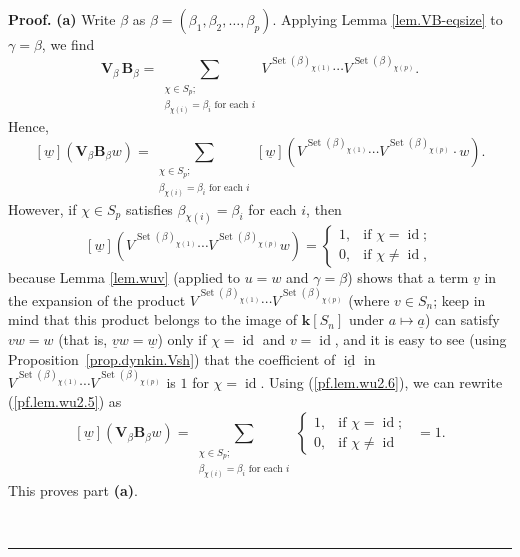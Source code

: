 \documentclass[submission]{FPSAC2026}
\newcommand{\id}{\operatorname{id}} %
\newcommand{\kk}{\mathbf{k}} %
\newcommand{\Set}{\operatorname{Set}}
\newenvironment{proof}[1][Proof]{\noindent\textbf{#1.} }{\ \rule{0.5em}{0.5em}}
\begin{document}
\begin{proof}
\textbf{(a)} Write $\beta$ as $\beta=\left(  \beta_{1},\beta_{2},\ldots
,\beta_{p}\right)  $.
Applying Lemma \ref{lem.VB-eqsize} to $\gamma=\beta$, we
find%
\[
\mathbf{V}_{\beta}\,\mathbf{B}_{\beta}=\sum_{\substack{\chi\in S_{p}%
;\\\beta_{\chi\left(  i\right)  }=\beta_{i}\text{ for each }i}}
V^{\operatorname{Set}(\beta)_{\chi(1)}}\cdots
V^{\operatorname{Set}(\beta)_{\chi(p)}}.
\]
Hence,%
\begin{equation}
\left[  \underline w \right]  \left(  \mathbf{V}_{\beta}\mathbf{B}_{\beta}w\right)
=\sum_{\substack{\chi\in S_{p};\\\beta_{\chi\left(  i\right)  }=\beta
_{i}\text{ for each }i}}\left[  \underline w\right]  \left( 
V^{\operatorname{Set}(\beta)_{\chi(1)}}\cdots
V^{\operatorname{Set}(\beta)_{\chi(p)}}\cdot w\right)  .\label{pf.lem.wu2.5}%
\end{equation}
However, if $\chi\in S_{p}$ satisfies $\beta_{\chi\left(  i\right)  }=\beta_{i}$
for each $i$, then
\begin{equation}
\left[  \underline w\right]  \left(  V^{\operatorname{Set}(\beta
)_{\chi(1)}}\cdots V^{\operatorname{Set}(\beta)_{\chi(p)}%
}w\right)  =%
\begin{cases}
1, & \text{if }\chi= \id ;\\
0, & \text{if }\chi\neq \id ,
\end{cases}
\label{pf.lem.wu2.6}%
\end{equation}
because Lemma \ref{lem.wuv} (applied to $u=w$ and $\gamma=\beta$)
shows that a term $\underline v$ in the expansion of the
product
$V^{\Set(\beta)_{\chi(1)}}\cdots V^{\Set(\beta)_{\chi(p)}}$
(where $v \in S_n$; keep in mind that this product belongs
to the image of $\kk[S_n]$ under $a \mapsto \underline a$)
can satisfy $vw = w$ (that is, $\underline vw=\underline w$)
only if $\chi= \id $ and
$v= \id $, and it is easy to see
(using Proposition~\ref{prop.dynkin.Vsh}) that the coefficient of
$\underline{ \id }$ in $V^{\operatorname{Set}(\beta
)_{\chi(1)}}\cdots V^{\operatorname{Set}(\beta)_{\chi(p)}}$
is $1$ for $\chi= \id $.
Using (\ref{pf.lem.wu2.6}), we can rewrite (\ref{pf.lem.wu2.5}) as%
\[
\left[  \underline w\right]  \left(  \mathbf{V}_{\beta}\mathbf{B}_{\beta}w\right)
=\sum_{\substack{\chi\in S_{p};\\\beta_{\chi\left(  i\right)  }=\beta
_{i}\text{ for each }i}}%
\begin{cases}
1, & \text{if }\chi= \id ;\\
0, & \text{if }\chi\neq \id %
\end{cases}
\ \ =1.
\]
This proves part \textbf{(a)}.
\medskip


\end{proof}
\end{document}
